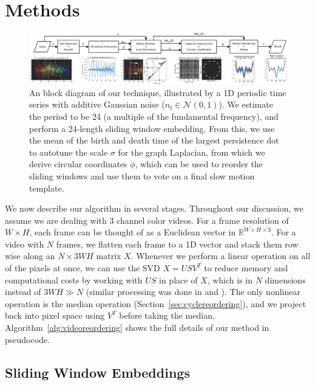 \documentclass{article}
\begin{document}
\section{Methods}
\label{sec:methods}

\begin{figure}
\centering
\includegraphics[width=\textwidth]{BlockDiagram.pdf}
\caption{An block diagram of our technique, illustrated by a 1D periodic time series with additive Gaussian noise ($n_t \in \mathcal{N}(0, 1)$).  We estimate the period to be 24 (a multiple of the fundamental frequency), and perform a 24-length sliding window embedding.  From this, we use the mean of the birth and death time of the largest persistence dot to autotune the scale $\sigma$ for the graph Laplacian, from which we derive circular coordinates $\phi$, which can be used to reorder the sliding windows and use them to vote on a final slow motion template.}
\label{fig:ConceptFigure}
\end{figure}



We now describe our algorithm in several stages.  Throughout our discussion, we assume we are dealing with 3 channel color videos.  For a frame resolution of $W \times H$, each frame can be thought of as a Euclidean vector in $\mathbb{R}^{W \times H \times 3}$.  For a video with $N$ frames, we flatten each frame to a 1D vector and stack them row wise along an $N \times 3WH$ matrix $X$.  Whenever we perform a linear operation on all of the pixels at once, we can use the SVD $X = USV^T$ to reduce memory and computational costs by working with $US$ in place of $X$, which is in $N$ dimensions instead of $3WH \gg N$ (similar processing was done in \cite{turk1991eigenfaces} and \cite{tralie2017quasi}).  The only nonlinear operation is the median operation (Section~\ref{sec:cyclereordering}), and we project back into pixel space using $V^T$ before taking the median. Algorithm~\ref{alg:videoreordering} shows the full details of our method in pseudocode.

\subsection{Sliding Window Embeddings}
\label{sec:slidingwindow}
\end{document}
